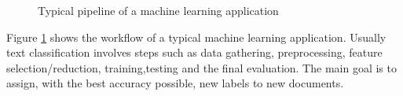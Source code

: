 \begin{figure}[htp]
	\centering
	\caption[Typical pipeline of a machine learning application]{Typical pipeline of a machine learning application}
	\label{fig:ml-pipeline}
\end{figure}
 
Figure \ref{fig:ml-pipeline} shows the workflow of a typical machine learning application. Usually text classification involves steps such as data gathering, preprocessing, feature selection/reduction, training,testing and the final evaluation. The main goal is to assign, with the best accuracy possible, new labels to new documents. 

